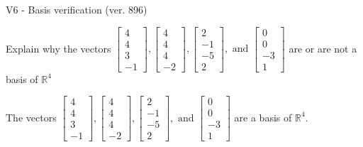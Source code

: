 \begin{exercise}
  \begin{exerciseTitle}V6 - Basis verification (ver. 896)\end{exerciseTitle}
  \begin{exerciseStatement}
    Explain why the vectors \(\left[\begin{array}{r}
4 \\
4 \\
3 \\
-1
\end{array}\right] , \left[\begin{array}{r}
4 \\
4 \\
4 \\
-2
\end{array}\right] , \left[\begin{array}{r}
2 \\
-1 \\
-5 \\
2
\end{array}\right] , \text{ and } \left[\begin{array}{r}
0 \\
0 \\
-3 \\
1
\end{array}\right]\) are or are not a basis of \(\mathbb{R}^4\)	


  \end{exerciseStatement}
  \begin{exerciseAnswer}
   The vectors \(\left[\begin{array}{r}
4 \\
4 \\
3 \\
-1
\end{array}\right] , \left[\begin{array}{r}
4 \\
4 \\
4 \\
-2
\end{array}\right] , \left[\begin{array}{r}
2 \\
-1 \\
-5 \\
2
\end{array}\right] , \text{ and } \left[\begin{array}{r}
0 \\
0 \\
-3 \\
1
\end{array}\right]\) 
  	 are  a basis of \(\mathbb{R}^4\).
  


  \end{exerciseAnswer}
\end{exercise}